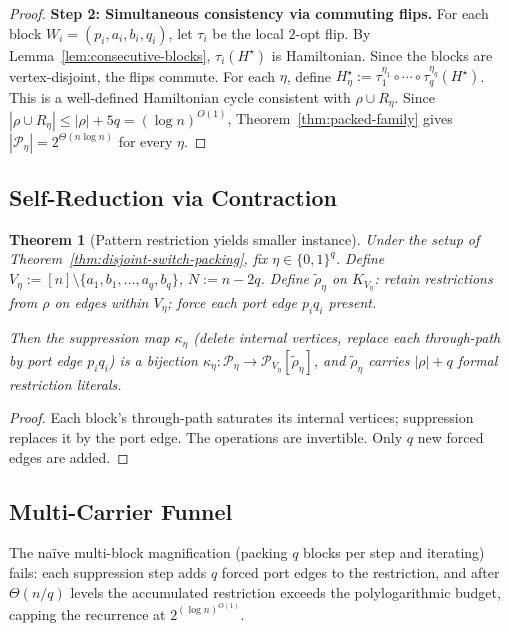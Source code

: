 \documentclass[11pt]{article}
\newtheorem{theorem}{Theorem}[section]
\begin{document}
\begin{proof}
\textbf{Step 2: Simultaneous consistency via commuting flips.}
For each block $W_i = (p_i, a_i, b_i, q_i)$, let $\tau_i$ be the local
$2$-opt flip.  By Lemma~\ref{lem:consecutive-blocks}, $\tau_i(H^\star)$ is
Hamiltonian.  Since the blocks are vertex-disjoint, the flips commute.
For each $\eta$, define
$H^\star_\eta := \tau_1^{\eta_1} \circ \cdots \circ \tau_q^{\eta_q}(H^\star)$.
This is a well-defined Hamiltonian cycle consistent with $\rho \cup R_\eta$.
Since $|\rho \cup R_\eta| \le |\rho| + 5q = (\log n)^{O(1)}$,
Theorem~\ref{thm:packed-family} gives
$|\mathcal{P}_\eta| = 2^{\Theta(n\log n)}$ for every $\eta$.
\end{proof}

\subsection{Self-Reduction via Contraction}

\begin{theorem}[Pattern restriction yields smaller instance]
\label{thm:contraction-bijection}
Under the setup of Theorem~\ref{thm:disjoint-switch-packing}, fix
$\eta \in \{0,1\}^q$.  Define
$V_\eta := [n] \setminus \{a_1, b_1, \ldots, a_q, b_q\}$, $N := n - 2q$.
Define $\tilde\rho_\eta$ on $K_{V_\eta}$: retain restrictions from $\rho$
on edges within $V_\eta$; force each port edge $p_iq_i$ present.

Then the suppression map $\kappa_\eta$ (delete internal vertices, replace
each through-path by port edge $p_iq_i$) is a bijection
$\kappa_\eta : \mathcal{P}_\eta \to \mathcal{P}_{V_\eta}[\tilde\rho_\eta]$,
and $\tilde\rho_\eta$ carries $|\rho| + q$ formal restriction literals.
\end{theorem}

\begin{proof}
Each block's through-path saturates its internal vertices; suppression
replaces it by the port edge.  The operations are invertible.  Only $q$
new forced edges are added.
\end{proof}

\subsection{Multi-Carrier Funnel}
\label{subsec:multi-carrier-funnel}

The na\"ive multi-block magnification (packing $q$ blocks per step and
iterating) fails: each suppression step adds $q$ forced port edges to the
restriction, and after $\Theta(n/q)$ levels the accumulated restriction
exceeds the polylogarithmic budget, capping the recurrence at
$2^{(\log n)^{O(1)}}$.
\end{document}
